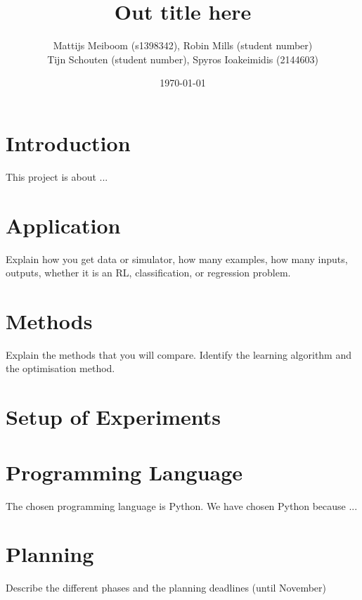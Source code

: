 \documentclass[a4paper, 11pt]{scrartcl}
\title{\Large Out title here}
\author{\small Mattijs Meiboom (s1398342), Robin Mills (student number)\\
			\small Tijn Schouten (student number), Spyros Ioakeimidis (2144603)}
\date{\small \today}
\begin{document}
\maketitle

\thispagestyle{empty}

\section{Introduction}

This project is about ...

\section{Application}

Explain how you get data or simulator, how many examples, how many inputs, outputs, whether it is an RL, classification, or regression problem.

\section{Methods}

Explain the methods that you will compare. Identify the learning algorithm and the optimisation method.

\section{Setup of Experiments}

\section{Programming Language}

The chosen programming language is Python. We have chosen Python because ...

\section{Planning}

Describe the different phases and the planning deadlines (until November)
\end{document}
